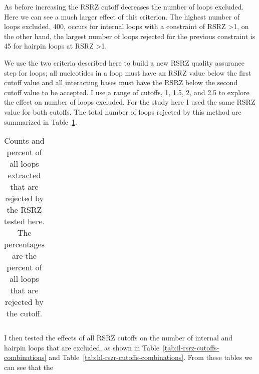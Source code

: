 As before increasing the RSRZ cutoff decreases the number of loops excluded.
Here we can see a much larger effect of this criterion. The highest number of
loops excluded, 400, occurs for internal loops with a constraint of RSRZ \textgreater 1, on
the other hand, the largest number of loops rejected for the previous constraint
is 45 for hairpin loops at RSRZ \textgreater 1.

We use the two criteria described here to build a new RSRZ quality assurance
step for loops; all nucleotides in a loop must have an RSRZ value below the
first cutoff value and all interacting bases must have the RSRZ below the second
cutoff value to be accepted. I use a range of cutoffs, 1, 1.5, 2, and 2.5 to
explore the effect on number of loops excluded. For the study here I used the
same RSRZ value for both cutoffs. The total number of loops rejected by this
method are summarized in Table~\ref{tab:rsrz-reject-summary}.

\begin{table}
  \begin{tabular}{llrrrrrrrr}
  \end{tabular}
  \caption{Counts and percent of all loops extracted that are rejected by the
    RSRZ tested here. The percentages are the percent of all loops that are
  rejected by the cutoff.}
  \label{tab:rsrz-reject-summary}
\end{table}

I then tested the effects of all RSRZ cutoffs on the number of internal and
hairpin loops that are excluded, as shown in
Table~\ref{tab:il-rsrz-cutoffs-combinations} and
Table~\ref{tab:hl-rszr-cutoffs-combinations}. From these tables we can see that
the 

